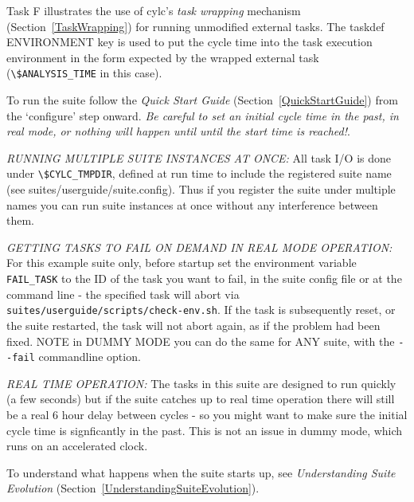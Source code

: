 Task F illustrates the use of cylc's {\em task wrapping} mechanism
(Section~\ref{TaskWrapping}) for running unmodified external tasks. 
The taskdef ENVIRONMENT key is used to put the cycle time
into the task execution environment in the form expected by the wrapped
external task (\lstinline=\$ANALYSIS_TIME= in this case). 

To run the suite follow the {\em Quick Start Guide}
(Section~\ref{QuickStartGuide}) from the `configure' step onward. 
{\em Be careful to set an initial cycle time in the past, in real mode,
or nothing will happen until until the start time is reached!}.

{\em RUNNING MULTIPLE SUITE INSTANCES AT ONCE:} All task I/O is done
under \lstinline=\$CYLC_TMPDIR=, defined at run time to include the
registered suite name (see suites/userguide/suite.config).  Thus if
you register the suite under multiple names you can run suite instances
at once without any interference between them.          

{\em GETTING TASKS TO FAIL ON DEMAND IN REAL MODE OPERATION:} For this
example suite only, before startup set the environment variable
\lstinline=FAIL_TASK= to the ID of the task you want to fail, in the
suite config file or at the command line - the specified task will
abort via \lstinline=suites/userguide/scripts/check-env.sh=.  If the
task is subsequently reset, or the suite restarted, the task will not
abort again, as if the problem had been fixed. NOTE in DUMMY MODE you
can do the same for ANY suite, with the \lstinline=--fail= commandline
option.

{\em REAL TIME OPERATION:} The tasks in this suite are designed to run
quickly (a few seconds) but if the suite catches up to real time
operation there will still be a real 6 hour delay between cycles - so
you might want to make sure the initial cycle time is signficantly in
the past. This is not an issue in dummy mode, which runs on an
accelerated clock.       

To understand what happens when the suite starts up, see {\em
Understanding Suite Evolution}
(Section~\ref{UnderstandingSuiteEvolution}).
